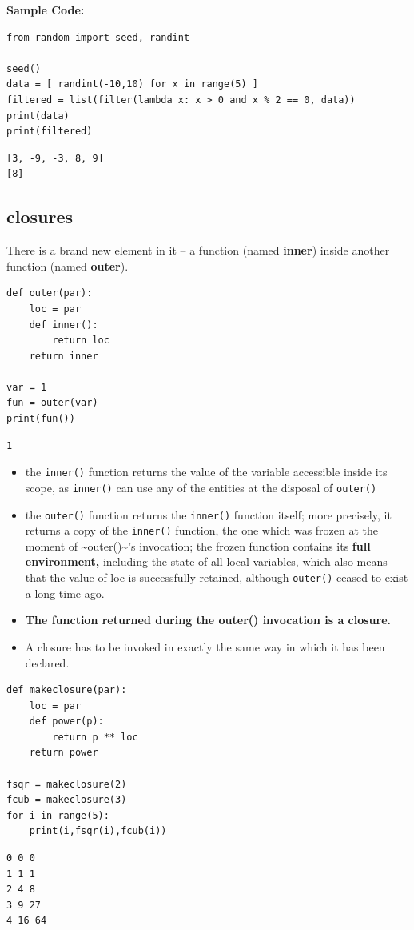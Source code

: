 \documentclass[11pt]{article}
\begin{document}
\textbf{Sample Code:}

\begin{verbatim}
from random import seed, randint

seed()
data = [ randint(-10,10) for x in range(5) ]
filtered = list(filter(lambda x: x > 0 and x % 2 == 0, data))
print(data)
print(filtered)
\end{verbatim}

\begin{verbatim}
[3, -9, -3, 8, 9]
[8]
\end{verbatim}
\vspace{10 mm}

\subsection{closures}
\label{sec:orgf00db3a}
There is a brand new element in it – a function (named \textbf{inner}) inside
another function (named \textbf{outer}).

\begin{verbatim}
def outer(par):
	loc = par
	def inner():
		return loc
	return inner

var = 1
fun = outer(var)
print(fun())
\end{verbatim}

\begin{verbatim}
1
\end{verbatim}

\vspace{10 mm}

\begin{itemize}
\item the \texttt{inner()} function returns the value of the variable accessible
inside its scope, as \texttt{inner()} can use any of the entities at the
disposal of \texttt{outer()}
\item the \texttt{outer()} function returns the \texttt{inner()} function itself; more
precisely, it returns a copy of the \texttt{inner()} function, the one
which was frozen at the moment of \textasciitilde{}outer()\textasciitilde{}’s invocation; the frozen
function contains its \textbf{full environment,} including the state of all
local variables, which also means that the value of loc is
successfully retained, although \texttt{outer()} ceased to exist a long time
ago.

\item \textbf{The function returned during the outer() invocation is a closure.}

\item A closure has to be invoked in exactly the same way in which it has been declared.
\end{itemize}

\begin{verbatim}
def makeclosure(par):
	loc = par
	def power(p):
		return p ** loc
	return power

fsqr = makeclosure(2)
fcub = makeclosure(3)
for i in range(5):
	print(i,fsqr(i),fcub(i))
\end{verbatim}

\begin{verbatim}
0 0 0
1 1 1
2 4 8
3 9 27
4 16 64
\end{verbatim}
\end{document}

